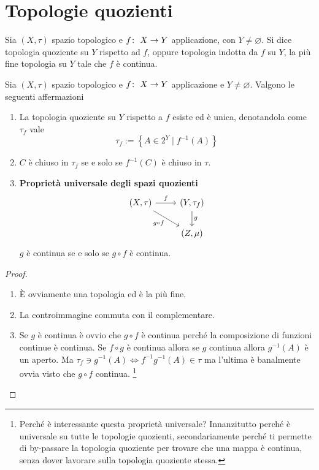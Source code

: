 \section{Topologie quozienti}

\begin{definition}
	Sia $(X, \tau)$ spazio topologico e $f \colon\ X \rightarrow Y$ applicazione, con $Y \neq \varnothing$. Si dice topologia quoziente su $Y$ rispetto ad $f$, oppure topologia indotta da $f$ su $Y$, la più fine topologia su $Y$ tale che $f$ è continua. 
\end{definition}

\begin{theorem}
	Sia $(X, \tau)$ spazio topologico e $f \colon\ X \rightarrow Y$ applicazione e $Y \neq \varnothing$. Valgono le seguenti affermazioni 
	\begin{enumerate}
		\item La topologia quoziente su $Y$ rispetto a $f$ esiste ed è unica, denotandola come $\tau_f$ vale 
		\begin{equation}
		\tau_f := \left\{ A \in 2^Y \; | 
		\; f^{-1}(A) \right\}
		\end{equation}
		\item $C$ è chiuso in $\tau_f$ se e solo se $f^{-1}(C)$ è chiuso in $\tau$.
		\item \textbf{Proprietà universale degli  spazi quozienti} 
		\begin{equation}
		\begin{tikzcd}
		(X, \tau) \arrow[swap]{rd}{g\circ f} \arrow{r}{f} & (Y, \tau_f) \arrow{d}{g} \\
		& (Z, \mu) 
		\end{tikzcd}
		\end{equation}
		$g$ è continua se e solo se $g \circ f$ è continua. 
	\end{enumerate}
\end{theorem}
\begin{proof}
	\begin{enumerate}
		\item È ovviamente una topologia ed è la più fine. 
		\item La controimmagine commuta con il complementare. 
		\item Se $g$ è continua è ovvio che $g \circ f$ è continua perché la composizione di funzioni continue è continua. Se $f\circ g$ è continua allora se $g$ continua allora $g^{-1}(A)$ è un aperto. Ma $ \tau_f \ni g^{-1}(A) \Leftrightarrow f^{-1}g^{-1}(A) \in \tau$ ma l'ultima è banalmente ovvia visto che $g \circ f$ continua. \footnote{Perché è interessante questa proprietà universale? Innanzitutto perché è universale su tutte le topologie quozienti, secondariamente perché ti permette di by-passare la topologia quoziente per trovare che una mappa è continua, senza dover lavorare sulla topologia quoziente stessa.}
	\end{enumerate}
\end{proof}

